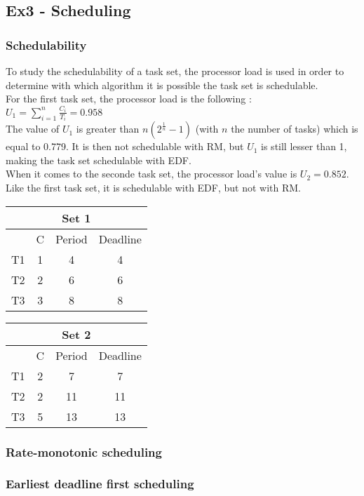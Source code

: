 \subsection{Ex3 - Scheduling}

\subsubsection{Schedulability}

To study the schedulability of a task set, the processor load is used in order to determine with which algorithm it is possible the task set is schedulable. \\

For the first task set, the processor load is the following : \\

$U_1 = \sum_{i=1}^{n} \frac{C_i}{T_i} = 0.958$ \\

The value of $U_1$ is greater than $n(2^{\frac{1}{n}}-1)$ (with $n$ the number of tasks) which is equal to 0.779. It is then not schedulable with RM, but $U_1$ is still lesser than 1, making the task set schedulable with EDF. \\

When it comes to the seconde task set, the processor load's value is $U_2 = 0.852$. Like the first task set, it is schedulable with EDF, but not with RM. \\

\begin{center}
	\begin{tabular}{|c|c|c|c|}
		\hline
		\multicolumn{4}{|c|}{\textbf{Set 1}} \\
		\hline
		\, & C & Period & Deadline \\
		\hline
		T1 & 1 & 4 & 4 \\
		\hline
		T2 & 2 & 6 & 6 \\
		\hline
		T3 & 3 & 8 & 8 \\
		\hline
	\end{tabular}
	\quad
	\begin{tabular}{|c|c|c|c|}
		\hline
		\multicolumn{4}{|c|}{\textbf{Set 2}} \\
		\hline
		\, & C & Period & Deadline \\
		\hline
		T1 & 2 & 7 & 7 \\
		\hline
		T2 & 2 & 11 & 11 \\
		\hline
		T3 & 5 & 13 & 13 \\
		\hline
	\end{tabular}
\end{center}

\subsubsection{Rate-monotonic scheduling}

\subsubsection{Earliest deadline first scheduling}
